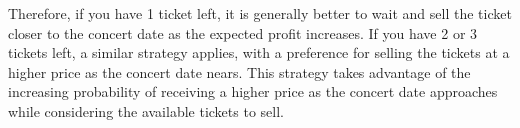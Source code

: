 \documentclass{article}
\begin{document}
\begin{enumerate}
\begin{enumerate}
        Therefore, if you have 1 ticket left, it is generally better to wait and sell the ticket closer to the concert date as the expected profit increases. If you have 2 or 3 tickets left, a similar strategy applies, with a preference for selling the tickets at a higher price as the concert date nears. This strategy takes advantage of the increasing probability of receiving a higher price as the concert date approaches while considering the available tickets to sell.
    \end{enumerate}

\end{enumerate}
\end{document}
